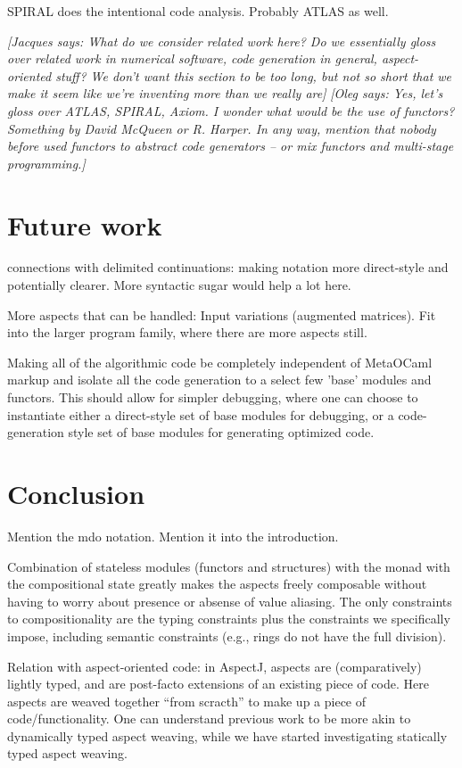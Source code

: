 \documentclass{llncs}
\newcommand{\oleg}[1]{{\it [Oleg says: #1]}}
\newcommand{\jacques}[1]{{\it [Jacques says: #1]}}
\begin{document}
SPIRAL does the intentional code analysis. Probably ATLAS as well.

\jacques{What do we consider \emph{related work} here?  Do we essentially gloss 
over related work in numerical software, code generation in general,
aspect-oriented stuff?  We don't want this section to be too long, but
not so short that we make it seem like we're inventing more than we
really are}
\oleg{Yes, let's gloss over ATLAS, SPIRAL, Axiom. I wonder what would
  be the use of functors? Something by David McQueen or R. Harper.
  In any way, mention that nobody before used functors to abstract
  code generators -- or mix functors and multi-stage programming.}


\section{Future work}\label{future}
connections with delimited continuations: making notation
more direct-style and potentially clearer.  More syntactic sugar
would help a lot here.

More aspects that can be handled: Input variations (augmented
matrices). Fit into the larger program family, where there are
more aspects still.

Making all of the algorithmic code be completely independent of 
MetaOCaml markup and isolate all the code generation to a select
few 'base' modules and functors.  This should allow for simpler
debugging, where one can choose to instantiate either a direct-style
set of base modules for debugging, or a code-generation style set
of base modules for generating optimized code.

\section{Conclusion}\label{conclusion}
Mention the mdo notation. Mention it into the introduction.

Combination of stateless modules (functors and structures) with
the monad with the compositional state greatly makes the aspects
freely composable without having to worry about presence or absense of
value aliasing. The only constraints to compositionality are the
typing constraints plus the constraints we specifically impose,
including semantic constraints (e.g., rings do not have the full
division).



Relation with aspect-oriented code: in AspectJ, aspects are (comparatively)
lightly typed, and are post-facto extensions of an existing piece of
code.  Here aspects are weaved together ``from scracth'' to make up a
piece of code/functionality.  One can understand previous work to be
more akin to dynamically typed aspect weaving, while we have started
investigating statically typed aspect weaving.



\end{document}
